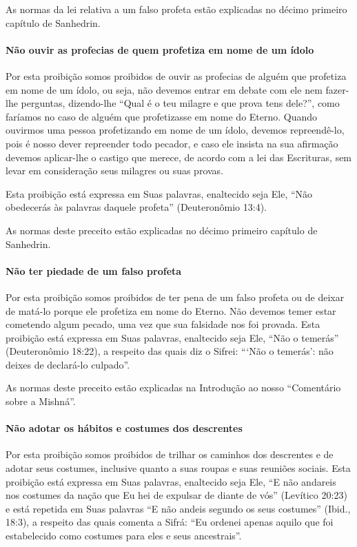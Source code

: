 As normas da lei relativa a um falso profeta estão explicadas no décimo
primeiro capítulo de Sanhedrin.

\paragraph{Não ouvir as profecias de quem profetiza em nome de um ídolo}

Por esta proibição somos proibidos de ouvir as profecias de alguém que
profetiza em nome de um ídolo, ou seja, não devemos entrar em debate com
ele nem fazer-lhe perguntas, dizendo-lhe ``Qual é o teu milagre e que
prova tens dele?'', como faríamos no caso de alguém que profetizasse em
nome do Eterno. Quando ouvirmos uma pessoa profetizando em nome de um
ídolo, devemos repreendê-lo, pois é nosso dever repreender todo pecador,
e caso ele insista na sua afirmação devemos aplicar-lhe o castigo que
merece, de acordo com a lei das Escrituras, sem levar em consideração
seus milagres ou suas provas.

Esta proibição está expressa em Suas palavras, enaltecido seja Ele,
``Não obedecerás às palavras daquele profeta'' (Deuteronômio 13:4).

As normas deste preceito estão explicadas no décimo primeiro capítulo
de Sanhedrin.

\paragraph{Não ter piedade de um falso profeta}

Por esta proibição somos proibidos de ter pena de um falso profeta ou de
deixar de matá-lo porque ele profetiza em nome do Eterno. Não devemos
temer estar cometendo algum pecado, uma vez que sua falsidade nos foi
provada. Esta proibição está expressa em Suas palavras, enaltecido seja
Ele, ``Não o temerás'' (Deuteronômio 18:22), a respeito das quais diz o
Sifrei: ```Não o temerás': não deixes de declará-lo culpado''.

As normas deste preceito estão explicadas na Introdução ao nosso
``Comentário sobre a Mishná''.

\paragraph{Não adotar os hábitos e costumes dos descrentes}

Por esta proibição somos proibidos de trilhar os caminhos dos descrentes
e de adotar seus costumes, inclusive quanto a suas roupas e suas
reuniões sociais. Esta proibição está expressa em Suas palavras,
enaltecido seja Ele, ``E não andareis nos costumes da nação que Eu hei
de expulsar de diante de vós'' (Levítico 20:23) e está repetida em Suas
palavras ``E não andeis segundo os seus costumes'' (Ibid., 18:3), a
respeito das quais comenta a Sifrá: ``Eu ordenei apenas aquilo que foi
estabelecido como costumes para eles e seus ancestrais''.

